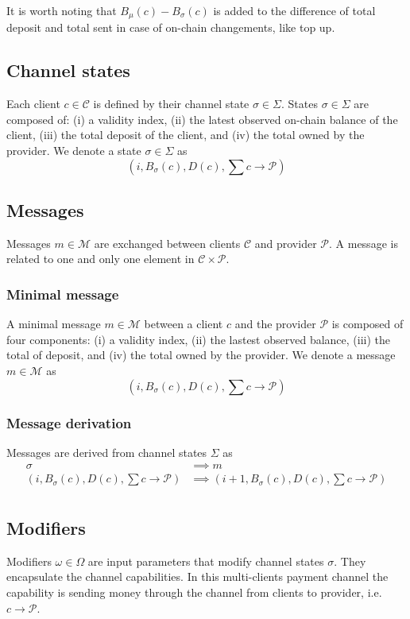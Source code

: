 \documentclass{llncs}
\begin{document}
It is worth noting that $B_\mu(c) - B_\sigma(c)$ is added to the difference of total deposit and total sent in case of on-chain changements, like top up.

\subsection{Channel states} Each client $c \in \mathcal{C}$ is defined by their channel state $\sigma \in \Sigma$. States $\sigma \in \Sigma$ are composed of: (i) a validity index, (ii) the latest observed on-chain balance
of the client, (iii) the total deposit of the client, and (iv) the total owned by the provider. We denote a state $\sigma \in \Sigma$ as
$$(i, B_\sigma(c), D(c), \textstyle \sum c \rightarrow \mathcal{P})$$

\subsection{Messages} Messages $m \in \mathcal{M}$ are exchanged between clients $\mathcal{C}$ and provider $\mathcal{P}$. A message is related to one and only one element in $\mathcal{C} \times \mathcal{P}$.

\subsubsection{Minimal message} A minimal message $m \in \mathcal{M}$ between a client $c$ and the provider $\mathcal{P}$ is composed of four components: (i) a validity index, (ii) the lastest observed balance, (iii) the total of deposit, and (iv) the total owned by the provider. We denote a message $m \in \mathcal{M}$ as
$$(i, B_\sigma(c), D(c), \textstyle \sum c \rightarrow \mathcal{P})$$

\subsubsection{Message derivation} Messages are derived from channel states $\Sigma$ as
\begin{equation*}
\begin{split}
    \sigma &\implies m \\
    (i, B_\sigma(c), D(c), \textstyle \sum c \rightarrow \mathcal{P}) &\implies (i+1, B_\sigma(c), D(c), \textstyle \sum c \rightarrow \mathcal{P}) \\
\end{split}
\end{equation*}

\subsection{Modifiers} Modifiers $\omega \in \Omega$ are input parameters that modify channel states $\sigma$. They encapsulate the channel capabilities. In this multi-clients payment channel the capability is sending money through the channel from clients to provider, i.e. $c \rightarrow \mathcal{P}$.
\end{document}
